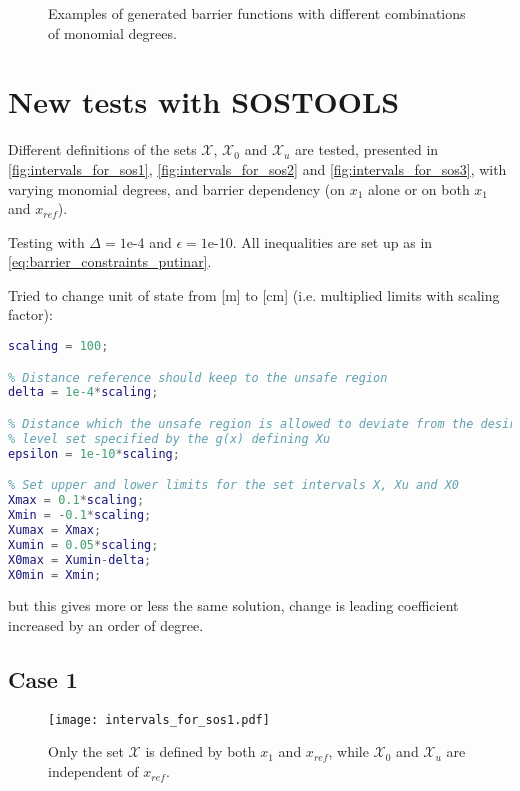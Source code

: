

\begin{figure}[H]
%
%
\hspace{1mm}
%
%
\caption{Examples of generated barrier functions with different combinations of monomial degrees.}
\end{figure}

\newpage
\section{New tests with SOSTOOLS}
Different definitions of the sets $\mathcal{X}$, $\mathcal{X}_0$ and $\mathcal{X}_u$ are tested, presented in \autoref{fig:intervals_for_sos1}, \ref{fig:intervals_for_sos2} and \ref{fig:intervals_for_sos3}, with varying monomial degrees, and barrier dependency (on $x_1$ alone or on both $x_1$ and $x_{ref}$).

Testing with $\Delta=1$e-4 and $\epsilon=1$e-10. All inequalities are set up as in \autoref{eq:barrier_constraints_putinar}.

Tried to change unit of state from [m] to [cm] (i.e. multiplied limits with scaling factor):
\begin{lstlisting}[language=matlab]
% scaling factor = 1 for [meter], or 100 for [cm]
scaling = 100;

% Distance reference should keep to the unsafe region
delta = 1e-4*scaling;

% Distance which the unsafe region is allowed to deviate from the desired zero
% level set specified by the g(x) defining Xu
epsilon = 1e-10*scaling;

% Set upper and lower limits for the set intervals X, Xu and X0
Xmax = 0.1*scaling;
Xmin = -0.1*scaling;
Xumax = Xmax;
Xumin = 0.05*scaling;
X0max = Xumin-delta;
X0min = Xmin;
\end{lstlisting}
but this gives more or less the same solution, change is leading coefficient increased by an order of degree.

\subsection{Case 1}\label{case1}
\begin{figure}[htbp]
\centering\texttt{[image: intervals\_for\_sos1.pdf]}
\caption{Only the set $\mathcal{X}$ is defined by both $x_1$ and $x_{ref}$, while $\mathcal{X}_0$ and $\mathcal{X}_u$ are independent of $x_{ref}$.}
\label{fig:intervals_for_sos1}
\end{figure}

